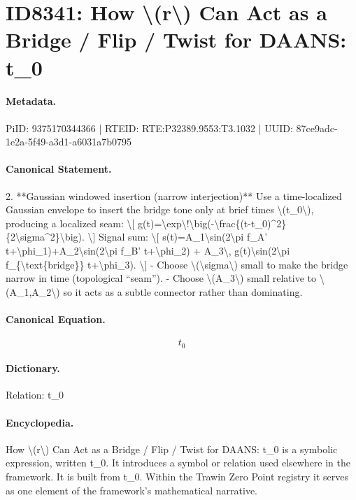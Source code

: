 \section*{ID8341: How \textbackslash{}(r\textbackslash{}) Can Act as a Bridge / Flip / Twist for DAANS: t\_0}
\paragraph{Metadata.}
PiID: 9375170344366 | RTEID: RTE:P32389.9553:T3.1032 | UUID: 87ce9adc-1e2a-5f49-a3d1-a6031a7b0795

\paragraph{Canonical Statement.}
2. **Gaussian windowed insertion (narrow interjection)** Use a time-localized Gaussian envelope to insert the bridge tone only at brief times \textbackslash{}(t\_0\textbackslash{}), producing a localized seam: \textbackslash{}[ g(t)=\textbackslash{}exp\textbackslash{}!\textbackslash{}big(-\textbackslash{}frac\{(t-t\_0)\textasciicircum{}2\}\{2\textbackslash{}sigma\textasciicircum{}2\}\textbackslash{}big). \textbackslash{}] Signal sum: \textbackslash{}[ s(t)=A\_1\textbackslash{}sin(2\textbackslash{}pi f\_A' t+\textbackslash{}phi\_1)+A\_2\textbackslash{}sin(2\textbackslash{}pi f\_B' t+\textbackslash{}phi\_2) + A\_3\textbackslash{}, g(t)\textbackslash{}sin(2\textbackslash{}pi f\_\{\textbackslash{}text\{bridge\}\} t+\textbackslash{}phi\_3). \textbackslash{}] - Choose \textbackslash{}(\textbackslash{}sigma\textbackslash{}) small to make the bridge narrow in time (topological “seam”). - Choose \textbackslash{}(A\_3\textbackslash{}) small relative to \textbackslash{}(A\_1,A\_2\textbackslash{}) so it acts as a subtle connector rather than dominating.

\paragraph{Canonical Equation.}
\[
t_0
\]

\paragraph{Dictionary.}
Relation: t\_0

\paragraph{Encyclopedia.}
How \textbackslash{}(r\textbackslash{}) Can Act as a Bridge / Flip / Twist for DAANS: t\_0 is a symbolic expression, written t\_0. It introduces a symbol or relation used elsewhere in the framework. It is built from t\_0. Within the Trawin Zero Point registry it serves as one element of the framework's mathematical narrative.
